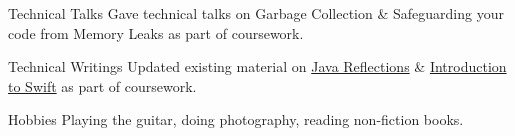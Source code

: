 


\begin{cvskills}


  \cvskill
  {Technical Talks}
  {Gave technical talks on Garbage Collection \& Safeguarding your code from Memory Leaks as part of coursework.}

  
  \cvskill
  {Technical Writings}
  {Updated existing material on \href{https://github.com/se-edu/learningresources/pull/30}{\color{teal}Java Reflections} \& \href{https://github.com/se-edu/learningresources/pull/31}{\color{teal}Introduction to Swift} as part of coursework.}


  \cvskill
  {Hobbies}
  {Playing the guitar, doing photography, reading non-fiction books.}


\end{cvskills}